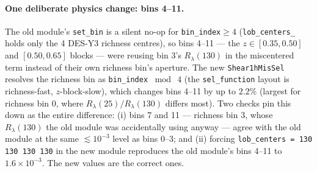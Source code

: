 \documentclass[a4paper, 11pt]{article}
\begin{document}
\paragraph{One deliberate physics change: bins 4--11.} The old
module's \texttt{set\_bin} is a silent no-op for
\texttt{bin\_index}$\ge4$ (\texttt{lob\_centers\_} holds only the 4
DES-Y3 richness centres), so bins 4--11 --- the $z\in[0.35,0.50]$ and
$[0.50,0.65]$ blocks --- were reusing bin 3's
$R_\lambda(130)$ in the miscentered term instead of their own richness
bin's aperture. The new \texttt{Shear1hMisSel} resolves the richness bin as
\texttt{bin\_index} $\bmod\ 4$ (the \texttt{sel\_function} layout is
richness-fast, $z$-block-slow), which changes bins 4--11 by up to
$2.2\%$ (largest for richness bin 0, where
$R_\lambda(25)/R_\lambda(130)$ differs most). Two checks pin this down
as the entire difference: (i) bins 7 and 11 --- richness bin 3, whose
$R_\lambda(130)$ the old module was accidentally using anyway ---
agree with the old module at the same $\lesssim10^{-3}$ level as bins
0--3; and (ii) forcing \texttt{lob\_centers = 130 130 130 130} in the
new module reproduces the old module's bins 4--11 to
$1.6\times10^{-3}$. The new values are the correct ones.
\end{document}
